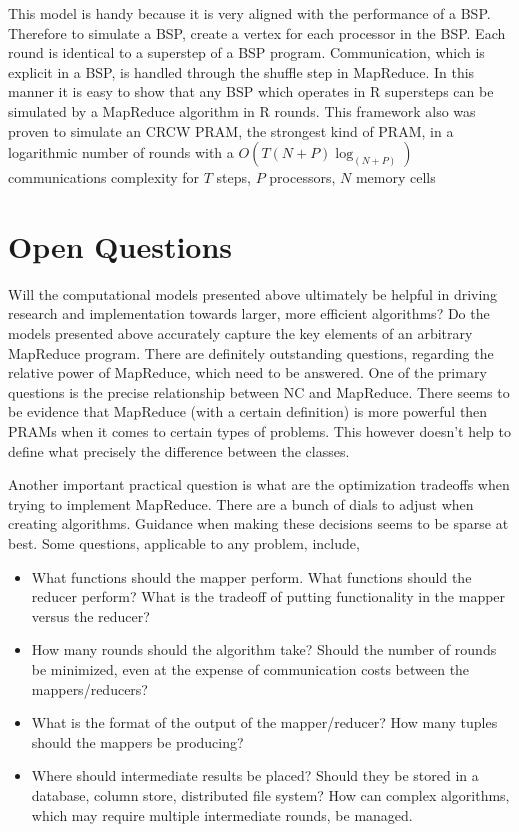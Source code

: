 \documentclass{article}
\begin{document}
This model is handy because it is very aligned with the performance of a BSP. Therefore to simulate a BSP, create a vertex for each processor in the BSP. Each round is identical to a superstep of a BSP program. Communication, which is explicit in a BSP, is handled through the shuffle step in MapReduce. In this manner it is easy to show that any BSP which operates in R supersteps can be simulated by a MapReduce algorithm in R rounds. This framework also was proven to simulate an CRCW PRAM, the strongest kind of PRAM, in a logarithmic number of rounds with a $O(T(N+P) \log_(N+P))$ communications complexity for $T$ steps, $P$ processors, $N$ memory cells


\section{Open Questions}
 Will the computational models presented above ultimately be helpful in driving research and implementation towards larger, more efficient algorithms? Do the models presented above accurately capture the key elements of an arbitrary MapReduce program. There are definitely outstanding questions, regarding the relative power of MapReduce, which need to be answered. One of the primary questions is the precise relationship between NC and MapReduce. There seems to be evidence that MapReduce (with a certain definition) is more powerful then PRAMs when it comes to certain types of problems. This however doesn't help to define what precisely the difference between the classes. 

Another important practical question is what are the optimization tradeoffs when trying to implement MapReduce. There are a bunch of dials to adjust when creating algorithms. Guidance when making these decisions seems to be sparse at best. Some questions, applicable to any problem, include, 
\begin{itemize}
\item
What functions should the mapper perform. What functions should the reducer perform? What is the tradeoff of putting functionality in the mapper versus the reducer?
\item 
How many rounds should the algorithm take? Should the number of rounds be minimized, even at the expense of communication costs between the mappers/reducers?
\item
What is the format of the output of the mapper/reducer? How many tuples should the mappers be producing?
\item 
Where should intermediate results be placed? Should they be stored in a database, column store, distributed file system? How can complex algorithms, which may require multiple intermediate rounds, be managed. 
\end{itemize}
\end{document}
